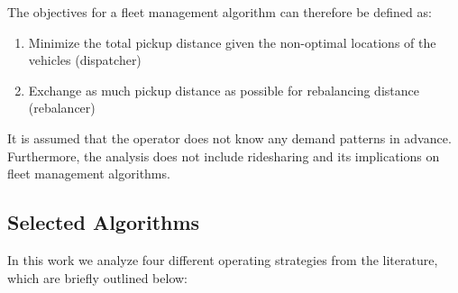 The objectives for a fleet management algorithm can therefore be defined as:

\begin{enumerate}
\item Minimize the total pickup distance given the non-optimal locations of the vehicles (dispatcher)
\item Exchange as much pickup distance as possible for rebalancing distance (rebalancer)
\end{enumerate}

It is assumed that the operator does not know any demand patterns in advance. Furthermore, the analysis does not include ridesharing and its implications on fleet management algorithms.

\subsection{Selected Algorithms}

In this work we analyze four different operating strategies from the literature,
which are briefly outlined below:

